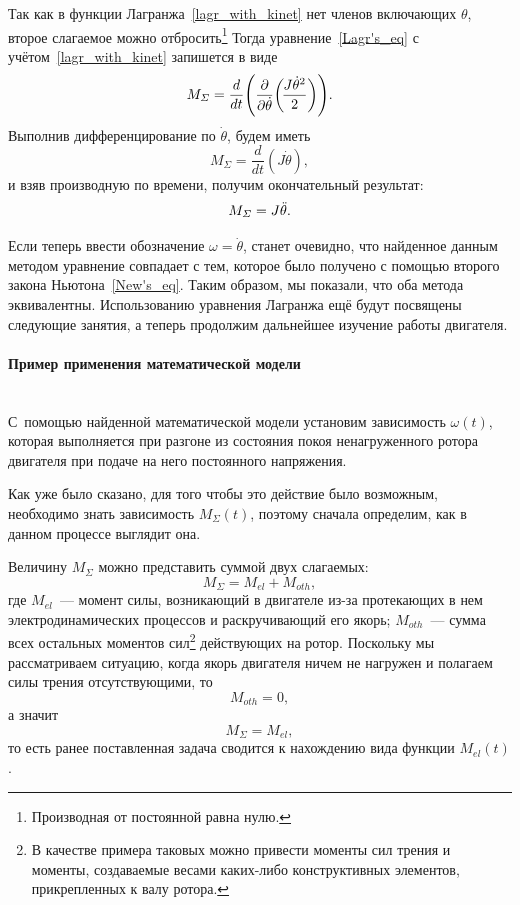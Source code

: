 \documentclass[12pt,a4paper,openany]{extarticle}
\begin{document}
Так как в функции Лагранжа~\eqref{lagr_with_kinet} нет членов включающих $\theta$, второе слагаемое можно отбросить\footnote{Производная от постоянной равна нулю.} 
Тогда уравнение~\eqref{Lagr's_eq} с учётом~\eqref{lagr_with_kinet} запишется в виде
\begin{equation}\label{Lagr's_eq_without_last}
	M_\varSigma = \frac{d}{dt}\Biggl(\frac{\partial}{\partial\dot\theta}\biggl(\!\frac{J\dot{\theta}^2}{2}\biggr)\Biggr)\ldotp
\end{equation}
Выполнив дифференцирование по $\dot\theta$, будем иметь
\begin{equation} \label{after_first_dif}
	M_\varSigma = \frac{d}{dt}\left(\!J\dot\theta\right)\!,
\end{equation}
и взяв производную по времени, получим окончательный результат:
\begin{equation} \label{after_sec_dif}
	M_\varSigma = J\ddot\theta\ldotp
\end{equation}

Если теперь ввести обозначение $\omega = \dot\theta$, станет очевидно, что найденное данным методом уравнение совпадает с тем, которое было  получено с помощью второго закона Ньютона~\eqref{New's_eq}. 
Таким образом, мы показали, что оба метода эквивалентны. 
Использованию уравнения Лагранжа ещё будут посвящены следующие занятия, а теперь продолжим дальнейшее изучение работы двигателя.
 
\paragraph*{Пример применения математической модели}$\phantom{-}$\\
\hspace*{\parindent}С~помощью найденной математической модели установим зависимость $\omega(t)$, которая выполняется при разгоне из состояния покоя ненагруженного ротора двигателя при подаче на него постоянного напряжения.

Как уже было сказано, для того чтобы это действие было возможным, необходимо знать зависимость $M_\varSigma(t)$, поэтому сначала определим, как в данном процессе выглядит она.

Величину $M_\varSigma$ можно представить суммой двух слагаемых:
\begin{equation}
	M_\varSigma = M_{el} + M_{oth},
\end{equation}
где $M_{el}$~--- момент силы, возникающий в двигателе из-за протекающих в нем электродинамических процессов и раскручивающий его якорь; $M_{oth}$~--- сумма всех остальных моментов сил\lefteqn{,}\footnote{В качестве примера таковых можно привести моменты сил трения и моменты, создаваемые весами каких-либо конструктивных элементов, прикрепленных к валу ротора.} действующих на ротор.
Поскольку мы рассматриваем ситуацию, когда якорь двигателя ничем не нагружен и полагаем силы трения отсутствующими, то 
\begin{equation}
	M_{oth} = 0,
\end{equation} 
а значит 
\begin{equation}
	M_\varSigma = M_{el},
\end{equation}
то есть ранее поставленная задача сводится к нахождению вида функции $M_{el}(t)$.
\end{document}
